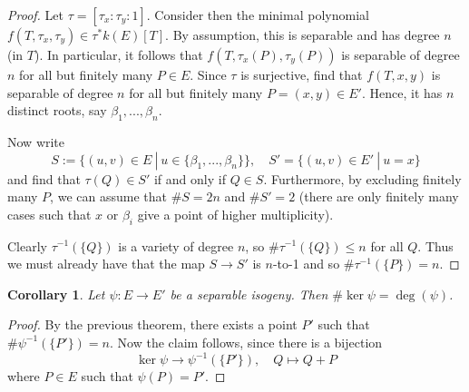 \documentclass{scrartcl}
\newtheorem{corollary}[prop]{Corollary}
\theoremstyle{definition}
\begin{document}
\begin{proof}
    Let $\tau = [\tau_x : \tau_y : 1]$.
    Consider then the minimal polynomial $f(T, \tau_x, \tau_y) \in \tau^*k(E)[T]$.
    By assumption, this is separable and has degree $n$ (in $T$).
    In particular, it follows that $f(T, \tau_x(P), \tau_y(P))$ is separable of degree $n$ for all but finitely many $P \in E$.
    Since $\tau$ is surjective, find that $f(T, x, y)$ is separable of degree $n$ for all but finitely many $P = (x, y) \in E'$.
    Hence, it has $n$ distinct roots, say $\beta_1, ..., \beta_n$.

    Now write
    \begin{equation*}
        S := \bigl\{ (u, v) \in E \ | \ u \in \{ \beta_1, ..., \beta_n \} \bigr\}, \quad S' = \bigl\{ (u, v) \in E' \ | \ u = x \bigr\}
    \end{equation*}
    and find that $\tau(Q) \in S'$ if and only if $Q \in S$.
    Furthermore, by excluding finitely many $P$, we can assume that $\#S = 2n$ and $\#S' = 2$ (there are only finitely many cases such that $x$ or $\beta_i$ give a point of higher multiplicity).

    Clearly $\tau^{-1}(\{Q\})$ is a variety of degree $n$, so $\#\tau^{-1}(\{Q\}) \leq n$ for all $Q$.
    Thus we must already have that the map $S \to S'$ is $n$-to-1 and so $\#\tau^{-1}(\{P\}) = n$.
\end{proof}
\begin{corollary}
    \label{prop:deg_separable_isogeny}
    Let $\psi: E \to E'$ be a separable isogeny.
    Then $\#\ker\psi = \deg(\psi)$. 
\end{corollary}
\begin{proof}
    By the previous theorem, there exists a point $P'$ such that $\#\psi^{-1}(\{P'\}) = n$.
    Now the claim follows, since there is a bijection
    \begin{equation*}
        \ker\psi \to \psi^{-1}(\{P'\}), \quad Q \mapsto Q + P
    \end{equation*}
    where $P \in E$ such that $\psi(P) = P'$.
\end{proof}
\end{document}
